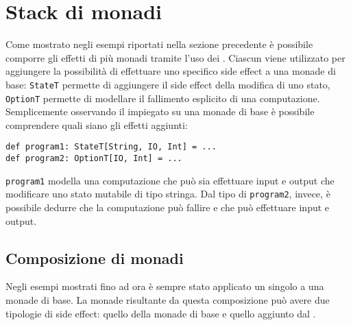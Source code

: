 \section{Stack di monadi}
\label{sec:stack-di-monadi}

Come mostrato negli esempi riportati nella sezione precedente è possibile comporre gli effetti di più monadi tramite l'uso dei . Ciascun  viene utilizzato per aggiungere la possibilità di effettuare uno specifico side effect a una monade di base: \lstinline{StateT} permette di aggiungere il side effect della modifica di uno stato, \lstinline{OptionT} permette di modellare il fallimento esplicito di una computazione.
Semplicemente osservando il  impiegato su una monade di base è possibile comprendere quali siano gli effetti aggiunti:
\begin{lstlisting}[language=scala3]
def program1: StateT[String, IO, Int] = ...
def program2: OptionT[IO, Int] = ...
\end{lstlisting}
\lstinline{program1} modella una computazione che può sia effettuare input e output che modificare uno stato mutabile di tipo stringa. Dal tipo di \lstinline{program2}, invece, è possibile dedurre che la computazione può fallire e che può effettuare input e output.

\subsection{Composizione di monadi}
Negli esempi mostrati fino ad ora è sempre stato applicato un singolo  a una monade di base. La monade risultante da questa composizione può avere due tipologie di side effect: quello della monade di base e quello aggiunto dal .

